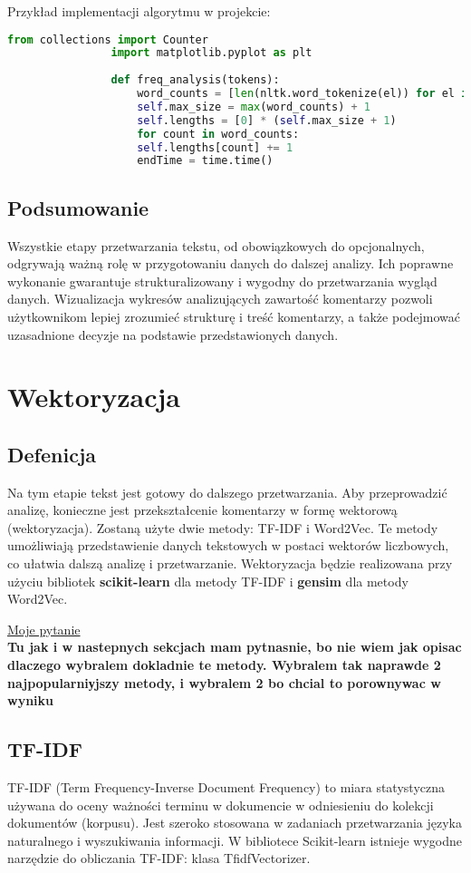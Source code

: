 			Przykład implementacji algorytmu w projekcie:
			\begin{lstlisting}[language=Python]
				from collections import Counter
				import matplotlib.pyplot as plt
				
				def freq_analysis(tokens):
					word_counts = [len(nltk.word_tokenize(el)) for el in self.nlp_data]
					self.max_size = max(word_counts) + 1
					self.lengths = [0] * (self.max_size + 1)
					for count in word_counts:
					self.lengths[count] += 1
					endTime = time.time()
			\end{lstlisting}
	
	\subsection{Podsumowanie}
		Wszystkie etapy przetwarzania tekstu, od obowiązkowych do opcjonalnych, odgrywają ważną rolę w przygotowaniu danych do dalszej analizy. Ich poprawne wykonanie gwarantuje strukturalizowany i wygodny do przetwarzania wygląd danych. Wizualizacja wykresów analizujących zawartość komentarzy pozwoli użytkownikom lepiej zrozumieć strukturę i treść komentarzy, a także podejmować uzasadnione decyzje na podstawie przedstawionych danych.
	
	
\section{Wektoryzacja}
	
	\subsection{Defenicja}
		Na tym etapie tekst jest gotowy do dalszego przetwarzania. Aby przeprowadzić analizę, konieczne jest przekształcenie komentarzy w formę wektorową (wektoryzacja). Zostaną użyte dwie metody: TF-IDF i Word2Vec. Te metody umożliwiają przedstawienie danych tekstowych w postaci wektorów liczbowych, co ułatwia dalszą analizę i przetwarzanie. Wektoryzacja będzie realizowana przy użyciu bibliotek \textbf{scikit-learn} \cite{scikit-learn} dla metody TF-IDF i \textbf{gensim} \cite{gensim} dla metody Word2Vec. 

		\underline{Moje pytanie}\\
		\textbf{Tu jak i w nastepnych sekcjach mam pytnasnie, bo nie wiem jak opisac dlaczego wybralem dokladnie te metody. Wybralem tak naprawde 2 najpopularniуjszy metody, i wybralem 2 bo chcial to porownywac w wyniku}

	
	\subsection{TF-IDF}
 		TF-IDF (Term Frequency-Inverse Document Frequency) to miara statystyczna używana do oceny ważności terminu w dokumencie w odniesieniu do kolekcji dokumentów (korpusu). Jest szeroko stosowana w zadaniach przetwarzania języka naturalnego i wyszukiwania informacji. W bibliotece Scikit-learn istnieje wygodne narzędzie do obliczania TF-IDF: klasa TfidfVectorizer.
		
